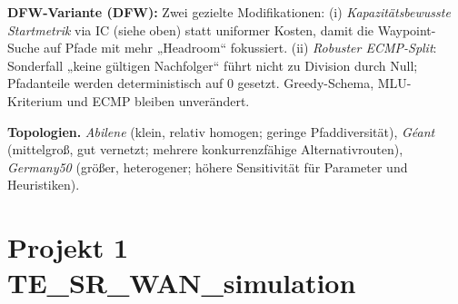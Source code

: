 \documentclass[sigconf,nonacm,review]{acmart}
\begin{document}
\textbf{DFW-Variante (DFW):}
Zwei gezielte Modifikationen:
(i) \emph{Kapazitätsbewusste Startmetrik} via IC (siehe oben) statt uniformer Kosten, damit die Waypoint-Suche auf Pfade mit
mehr „Headroom“ fokussiert.
(ii) \emph{Robuster ECMP-Split}: Sonderfall „keine gültigen Nachfolger“ führt nicht zu Division durch Null; Pfadanteile werden
deterministisch auf 0 gesetzt. Greedy-Schema, MLU-Kriterium und ECMP bleiben unverändert.

\textbf{Topologien.}
\emph{Abilene} (klein, relativ homogen; geringe Pfaddiversität), \emph{Géant} (mittelgroß, gut vernetzt; mehrere
konkurrenzfähige Alternativrouten), \emph{Germany50} (größer, heterogener; höhere Sensitivität für Parameter und Heuristiken).


\section{Projekt 1\,\textemdash\,TE\_SR\_WAN\_simulation}
\end{document}

